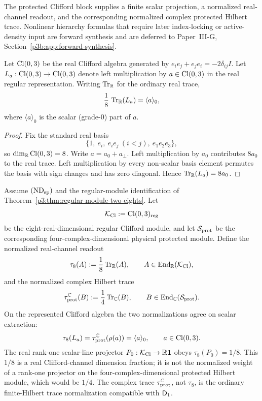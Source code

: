 \documentclass[12pt,a4paper]{article}
\begin{document}
The protected Clifford block supplies a finite scalar projection, a normalized real-channel readout, and the corresponding normalized complex protected Hilbert trace.  Nonlinear hierarchy formulas that require later index-locking or active-density input are forward synthesis and are deferred to Paper~III-G, Section~\ref{p3b:app:forward-synthesis}.

\begin{lemma}
\label{p3:lem:clifford_scalar_projection}
Let $\operatorname{Cl}(0,3)$ be the real Clifford algebra generated by
$e_i e_j + e_j e_i = -2\delta_{ij}I$.  Let
$L_a:\operatorname{Cl}(0,3)\to\operatorname{Cl}(0,3)$ denote left multiplication by
$a\in\operatorname{Cl}(0,3)$ in the real regular representation.  Writing
$\operatorname{Tr}_{\mathbb R}$ for the ordinary real trace,
\[
\frac{1}{8}\,\operatorname{Tr}_{\mathbb R}(L_a)=\langle a\rangle_0,
\]
where $\langle a\rangle_0$ is the scalar (grade-$0$) part of $a$.
\end{lemma}

\begin{proof}
Fix the standard real basis
\[
\{1,\ e_i,\ e_ie_j\ (i<j),\ e_1e_2e_3\},
\]
so $\dim_{\mathbb R}\operatorname{Cl}(0,3)=8$.  Write $a=a_0+a_\perp$.  Left
multiplication by $a_0$ contributes $8a_0$ to the real trace.  Left
multiplication by every non-scalar basis element permutes the basis with sign
changes and has zero diagonal.  Hence
$\operatorname{Tr}_{\mathbb R}(L_a)=8a_0$.
\end{proof}

\begin{theorem}
\label{p3:thm:normalized-protected-octet-trace}
Assume \((\mathrm{ND}_{\rm sp})\) and the regular-module identification of
Theorem~\ref{p3:thm:regular-module-two-eights}.  Let
\[
 \mathcal K_{\rm Cl}:=\operatorname{Cl}(0,3)_{\rm reg}
\]
be the eight-real-dimensional regular Clifford module, and let
\(\mathcal S_{\rm prot}\) be the corresponding four-complex-dimensional
physical protected module.  Define the normalized real-channel readout
\begin{equation}
 \tau_8(A):=\frac18\operatorname{Tr}_{\mathbb R}(A),
 \qquad A\in\operatorname{End}_{\mathbb R}(\mathcal K_{\rm Cl}),
 \label{p3:eq:normalized-octet-trace}
\end{equation}
and the normalized complex Hilbert trace
\[
 \tau_{\rm prot}^{\mathbb C}(B)
 :=\frac14\operatorname{Tr}_{\mathbb C}(B),
 \qquad B\in\operatorname{End}_{\mathbb C}(\mathcal S_{\rm prot}).
\]
On the represented Clifford algebra the two normalizations agree on scalar
extraction:
\[
 \tau_8(L_a)
 =\tau_{\rm prot}^{\mathbb C}(\rho(a))
 =\langle a\rangle_0,
 \qquad a\in\operatorname{Cl}(0,3).
\]
The real rank-one scalar-line projector
\(P_0:\mathcal K_{\rm Cl}\to\mathbb R\mathbf1\) obeys
\(\tau_8(P_0)=1/8\).  This \(1/8\) is a real Clifford-channel dimension
fraction; it is not the normalized weight of a rank-one projector on the
four-complex-dimensional protected Hilbert module, which would be \(1/4\).
The complex trace \(\tau_{\rm prot}^{\mathbb C}\), not \(\tau_8\), is the
ordinary finite-Hilbert trace normalization compatible with \(\mathsf{D}_1\).
\end{theorem}
\end{document}
